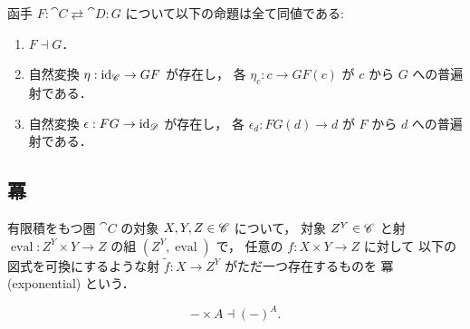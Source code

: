 \documentclass[titlepage]{ltjsreport}
\begin{document}
\begin{theorem}[随伴函手の並列定義]\label{thm:adjoint-functor-definitions}
  函手 $F:\cat{C}\rightleftarrows\cat{D}:G$ について以下の命題は全て同値である:
  \begin{enumerate}
    \item $F\dashv G$．
    \item 自然変換 $\eta:\mathrm{id}_{\mathscr{C}}\to GF$ が存在し，
          各 $\eta_c:c\to GF(c)$ が $c$ から $G$ への普遍射である．
    \item 自然変換 $\epsilon:FG\to\mathrm{id}_{\mathscr{D}}$ が存在し，
          各 $\epsilon_d:FG(d)\to d$ が $F$ から $d$ への普遍射である．
  \end{enumerate}
\end{theorem}

\subsection{冪}

\begin{definition}[冪]
  \def\C{\cat{C}}%
  \def\a{X}%
  \def\b{Y}%
  \def\c{Z}%
  \def\e{\operatorname{eval}}%
  有限積をもつ圏 $\C$ の対象 $\a,\b,\c\in\objs{\C}$ について，
  対象 $\c^\b\in\objs{\C}$ と射 $\e:\c^\b\times\b\to\c$ の組 $(\c^\b,\e)$ で，
  任意の $f:\a\times\b\to\c$ に対して
  以下の図式を可換にするような射 $\tilde{f}:\a\to\c^\b$ がただ一つ存在するものを
  冪 (exponential) という．
  \begin{center}
    
  \end{center}
\end{definition}

\begin{theorem}[並列定義の系]
  \begin{equation}
    -\times A\dashv{(-)}^A.
  \end{equation}
\end{theorem}
\end{document}
